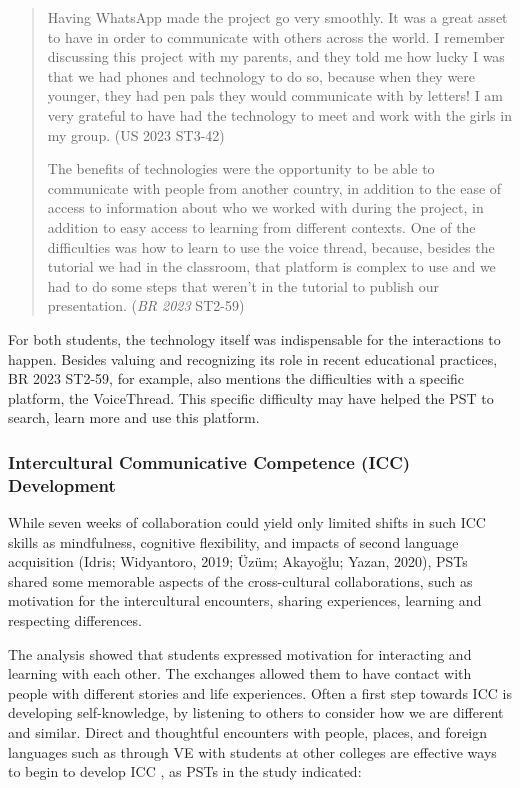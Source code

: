 \begin{quote}
Having WhatsApp made the project go very smoothly. It was a great
asset to have in order to communicate with others across the world. I
remember discussing this project with my parents, and they told me how
lucky I was that we had phones and technology to do so, because when
they were younger, they had pen pals they would communicate with by
letters! I am very grateful to have had the technology to meet and work
with the girls in my group. (US 2023 ST3-42)

The benefits of technologies were the opportunity to be able to
communicate with people from another country, in addition to the ease of
access to information about who we worked with during the project, in
addition to easy access to learning from different contexts. One of the
difficulties was how to learn to use the voice thread, because, besides
the tutorial we had in the classroom, that platform is complex to use
and we had to do some steps that weren’t in the tutorial
to publish our presentation. (\emph{BR 2023} ST2-59)
\end{quote}

For both students, the technology itself was indispensable for the
interactions to happen. Besides valuing and recognizing its role in
recent educational practices, BR 2023 ST2-59, for example, also
mentions the difficulties with a specific platform, the VoiceThread.
This specific difficulty may have helped the PST to search, learn more
and use this platform.

\subsubsection{Intercultural Communicative Competence (ICC) Development}\label{sub-sub-sec-intercultural}

While seven weeks of collaboration could yield only limited shifts in
such ICC skills as mindfulness, cognitive flexibility, and impacts of
second language acquisition (Idris; Widyantoro, 2019; Üzüm; Akayoğlu;
Yazan, 2020), PSTs shared some memorable aspects of the cross-cultural
collaborations, such as motivation for the intercultural encounters,
sharing experiences, learning and respecting differences.

The analysis showed that students expressed motivation for interacting
and learning with each other. The exchanges allowed them to have contact
with people with different stories and life experiences. Often a first
step towards ICC is developing self-knowledge, by listening to others to
consider how we are different and similar. Direct and thoughtful
encounters with people, places, and foreign languages such as through VE
with students at other colleges are effective ways to begin to develop
ICC \cite{idris2019intercultural,lopez2017developing}, as PSTs in the
study indicated:

